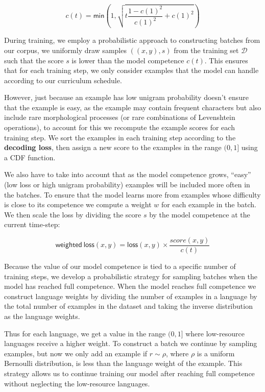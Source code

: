 \documentclass[11pt,a4paper]{article}
\begin{document}

\begin{equation}
    c(t) = \mathsf{min}(1, \sqrt{t\frac{1-c(1)^2}{c(1)^2}+c(1)^2})
\end{equation}

During training, we employ a probabilistic approach to constructing
batches from our corpus, we uniformly draw samples $((x, y), s)$ from
the training set $\mathcal{D}$ such that the score $s$ is lower than
the model competence $c(t)$. This ensures that for each training
step, we only consider examples that the model can handle according
to our curriculum schedule.

However, just because an example has low unigram probability doesn't
ensure that the example is easy, as the example may contain frequent
characters but also include rare morphological processes (or rare
combinations of Levenshtein operations), to account for this we
recompute the example scores for each training step. We sort the
examples in each training step according to the \textbf{decoding
loss}, then assign a new score to the examples in the range
$(0, 1]$ using a CDF function.

We also have to take into account that as the model competence grows,
``easy'' (low loss or high unigram probability) examples will be
included more often in the batches. To ensure that the model learns
more from examples whose difficulty is close to its competence we
compute a weight $w$ for each example in the batch. We then scale the
loss by dividing the score $s$ by the model competence at the current
time-step:

\begin{equation}
\mathsf{weighted\ loss}(x, y) = \mathsf{loss}(x, y) \times \frac{score(x, y)}{c(t)}
\end{equation}

Because the value of our model competence is tied to a specific number
of training steps, we develop a probabilistic strategy for sampling
batches when the model has reached full competence.  When the model
reaches full competence we construct language weights by dividing the
number of examples in a language by the total number of examples in
the dataset and taking the inverse distribution as the language
weights.

Thus for each language, we get a value in the range $(0,1]$ where
low-resource languages receive a higher weight.  To construct a batch
we continue by sampling examples, but now we only add an example if
$r \sim \rho$, where $\rho$ is a uniform Bernoulli distribution, is
less than the language weight of the example.  This strategy allows us
to continue training our model after reaching full competence without
neglecting the low-resource languages.
\end{document}
